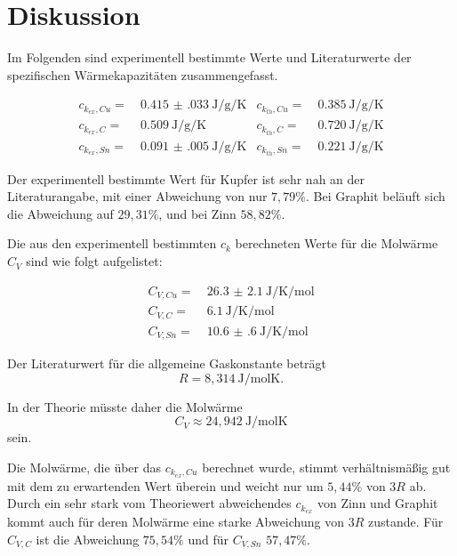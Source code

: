 \section{Diskussion}
\label{sec:Diskussion}

Im Folgenden sind experimentell bestimmte Werte und Literaturwerte der spezifischen Wärmekapazitäten zusammengefasst.

\begin{align*}
    c_{k_{ex},Cu} =& \:\SI{0.415(033)}{\joule\per\g\per\kelvin}&   c_{k_{th},Cu} =& \:\SI{0.385}{\joule\per\g\per\kelvin} \\
    c_{k_{ex},C} =& \:\SI{0.509}{\joule\per\g\per\kelvin}&   c_{k_{th},C} =& \:\SI{0,720}{\joule\per\g\per\kelvin} \\
    c_{k_{ex},Sn} =& \:\SI{0.091(005)}{\joule\per\g\per\kelvin}&   c_{k_{th},Sn} =& \:\SI{0.221}{\joule\per\g\per\kelvin} 
\end{align*}

Der experimentell bestimmte Wert für Kupfer ist sehr nah an der Literaturangabe, mit einer Abweichung von nur $7,79\si{\percent}$.
Bei Graphit beläuft sich die Abweichung auf $29,31\si{\percent}$, und bei Zinn $58,82\si{\percent}$. 

Die aus den experimentell bestimmten $c_k$ berechneten Werte für die Molwärme $C_V$ sind wie folgt aufgelistet:

\begin{align*}
    C_{V,Cu}=&\:\SI{26.3(21)}{\joule\per\kelvin\per\mol} \\
    C_{V,C}=&\:\SI{6.1}{\joule\per\kelvin\per\mol} \\
    C_{V,Sn}=&\:\SI{10.6(6)}{\joule\per\kelvin\per\mol}
\end{align*}

Der Literaturwert für die allgemeine Gaskonstante beträgt 
\begin{equation}
    R = 8,314\:\si{\joule\per\mol\kelvin}.
\end{equation}

In der Theorie müsste daher die Molwärme 
\begin{equation}
    C_V \approx 24,942\:\si{\joule\per\mol\kelvin}
\end{equation}
sein. 

Die Molwärme, die über das $c_{k_{ex},Cu}$ berechnet wurde, stimmt verhältnismäßig gut mit dem zu erwartenden Wert überein und weicht
nur um $5,44\si{\percent}$ von $3R$ ab. Durch ein sehr stark vom Theoriewert abweichendes $c_{k_{ex}}$ von Zinn und Graphit kommt auch
für deren Molwärme eine starke Abweichung von $3R$ zustande. Für $C_{V,C}$ ist die Abweichung $75,54\si{\percent}$ und für $C_{V,Sn}$
$57,47\si{\percent}$. 

